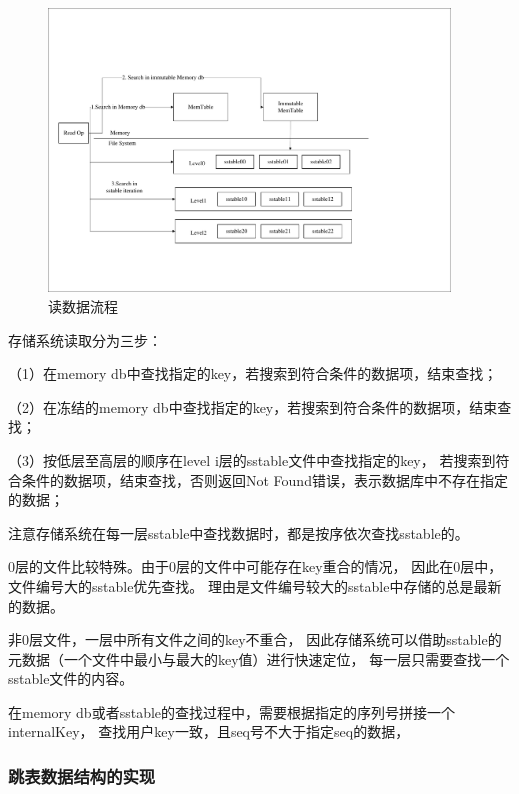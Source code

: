 \begin{enumerate}
		\begin{figure}[H]
			\centering
			\includegraphics[width=0.95\textwidth]{pdf/readop.pdf}
			\caption{读数据流程}
			\label{readop}
		\end{figure}

		存储系统读取分为三步：

		（1）在memory db中查找指定的key，若搜索到符合条件的数据项，结束查找；

		（2）在冻结的memory db中查找指定的key，若搜索到符合条件的数据项，结束查找；
		
		（3）按低层至高层的顺序在level i层的sstable文件中查找指定的key，
		若搜索到符合条件的数据项，结束查找，否则返回Not Found错误，表示数据库中不存在指定的数据；

		注意存储系统在每一层sstable中查找数据时，都是按序依次查找sstable的。

		0层的文件比较特殊。由于0层的文件中可能存在key重合的情况，
		因此在0层中，文件编号大的sstable优先查找。
		理由是文件编号较大的sstable中存储的总是最新的数据。

		非0层文件，一层中所有文件之间的key不重合，
		因此存储系统可以借助sstable的元数据（一个文件中最小与最大的key值）进行快速定位，
		每一层只需要查找一个sstable文件的内容。

		在memory db或者sstable的查找过程中，需要根据指定的序列号拼接一个internalKey，
		查找用户key一致，且seq号不大于指定seq的数据，
		
		\end{enumerate}
	
		\subsubsection{跳表数据结构的实现}

